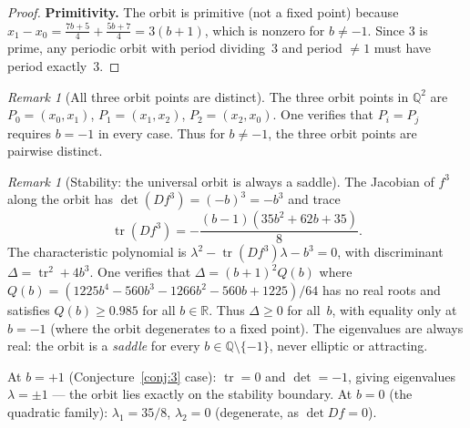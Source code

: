 \documentclass[11pt]{article}
\theoremstyle{definition}
\theoremstyle{remark}
\newtheorem{remark}[theorem]{Remark}
\begin{document}
\begin{proof}
  \smallskip\noindent\textbf{Primitivity.}
  The orbit is primitive (not a fixed point) because
  $x_1 - x_0 = \frac{7b+5}{4} + \frac{5b+7}{4} = 3(b+1)$,
  which is nonzero for $b \neq -1$.
  Since $3$ is prime, any periodic orbit with period dividing~$3$ and period $\neq 1$
  must have period exactly~$3$.
\end{proof}

\begin{remark}[All three orbit points are distinct]\label{rem:distinct}
  The three orbit points in $\mathbb{Q}^2$ are
  $P_0 = (x_0, x_1)$, $P_1 = (x_1, x_2)$, $P_2 = (x_2, x_0)$.
  One verifies that $P_i = P_j$ requires $b = -1$ in every case.
  Thus for $b \neq -1$, the three orbit points are pairwise distinct.
\end{remark}

\begin{remark}[Stability: the universal orbit is always a saddle]\label{rem:saddle}
  The Jacobian of $f^3$ along the orbit has $\det(Df^3) = (-b)^3 = -b^3$ and
  trace
  \[
    \operatorname{tr}(Df^3) = -\frac{(b-1)(35b^2 + 62b + 35)}{8}.
  \]
  The characteristic polynomial is $\lambda^2 - \operatorname{tr}(Df^3)\lambda - b^3 = 0$,
  with discriminant $\Delta = \operatorname{tr}^2 + 4b^3$.
  One verifies that $\Delta = (b+1)^2 Q(b)$ where
  $Q(b) = (1225b^4 - 560b^3 - 1266b^2 - 560b + 1225)/64$ has no real roots and
  satisfies $Q(b) \geq 0.985$ for all $b \in \mathbb{R}$.
  Thus $\Delta \geq 0$ for all~$b$, with equality only at $b = -1$
  (where the orbit degenerates to a fixed point).
  The eigenvalues are always real: the orbit is a \emph{saddle} for every
  $b \in \mathbb{Q} \setminus \{-1\}$, never elliptic or attracting.

  At $b = +1$ (Conjecture~\ref{conj:3} case):
  $\operatorname{tr} = 0$ and $\det = -1$, giving eigenvalues $\lambda = \pm 1$ ---
  the orbit lies exactly on the stability boundary.
  At $b = 0$ (the quadratic family): $\lambda_1 = 35/8$, $\lambda_2 = 0$
  (degenerate, as $\det Df = 0$).
\end{remark}
\end{document}
